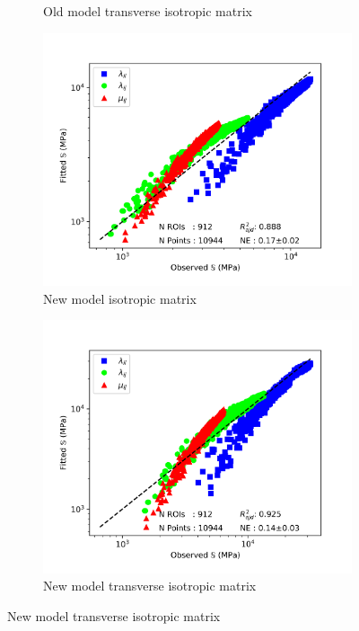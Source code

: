 \documentclass[a4paper,fleqn]{DC_ArtStyle}
\begin{document}
\begin{figure}
\begin{subfigure}[b]{0.45\linewidth}
			\caption{Old model transverse isotropic matrix}
		\end{subfigure}
		\begin{subfigure}[b]{0.45\linewidth}
			\includegraphics[width=\linewidth]{RegressionFabricK_Isotropic}
			\caption{New model isotropic matrix}
		\end{subfigure}
		\begin{subfigure}[b]{0.45\linewidth}
			\includegraphics[width=\linewidth]{RegressionFabricK_Transverse}
			\caption{New model transverse isotropic matrix}
		\end{subfigure}
	\end{figure}
\end{document}
